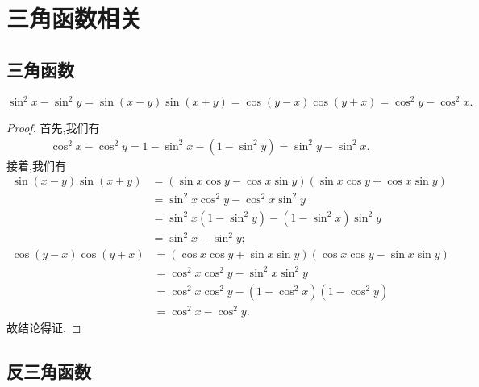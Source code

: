\documentclass[../../main.tex]{subfiles}
\begin{document}
\section{三角函数相关}

\subsection{三角函数}

\begin{proposition}[三角平方差公式]\label{proposition:三角平方差}
$\sin^2 x-\sin^2 y=\sin(x-y)\sin(x+y)=\cos(y-x)\cos(y+x)=\cos^2 y-\cos^2 x.$
\end{proposition}
\begin{proof}
首先,我们有
\begin{align*}
\cos ^2x-\cos ^2y=1-\sin ^2x-\left( 1-\sin ^2y \right) =\sin ^2y-\sin ^2x.
\end{align*}
接着,我们有
\begin{align*}
\sin(x-y)\sin(x+y) &= (\sin x \cos y - \cos x \sin y)(\sin x \cos y + \cos x \sin y) \\
&= \sin^2 x \cos^2 y - \cos^2 x \sin^2 y \\
&= \sin^2 x (1 - \sin^2 y) - (1 - \sin^2 x) \sin^2 y \\
&= \sin^2 x - \sin^2 y;
\end{align*}
\begin{align*}
\cos(y-x)\cos(y+x) &= (\cos x \cos y + \sin x \sin y)(\cos x \cos y - \sin x \sin y) \\
&= \cos^2 x \cos^2 y - \sin^2 x \sin^2 y \\
&= \cos^2 x \cos^2 y - (1 - \cos^2 x)(1 - \cos^2 y) \\
&= \cos^2 x - \cos^2 y.
\end{align*}
故结论得证.
\end{proof}

\subsection{反三角函数}
\end{document}
